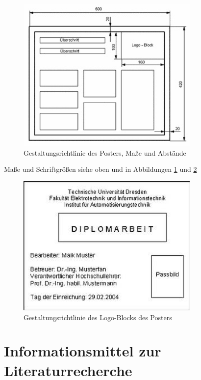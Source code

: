 \begin{figure}[ht]
  \centering
  \includegraphics[keepaspectratio, width=9cm]{example_files/RTEmagicC_poster.jpg}
  \caption{Gestaltungsrichtlinie des Posters, Maße und Abstände}
  \label{fig:poster}
\end{figure}

Maße und Schriftgrößen siehe oben und in Abbildungen \ref{fig:poster} und \ref{fig:poster-logo-block}

\begin{figure}[ht]
  \centering
  \includegraphics[keepaspectratio, width=9cm]{example_files/RTEmagicC_muster.jpg}
  \caption{Gestaltungsrichtlinie des Logo-Blocks des Posters}
  \label{fig:poster-logo-block}
\end{figure}


\section{Informationsmittel zur Literaturrecherche}
\label{sec:InformationsmittelZurLiteraturrecherche}

